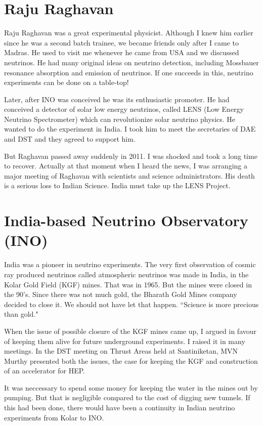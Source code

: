 \section*{Raju Raghavan}

Raju Raghavan was a great experimental physicist. Although I knew him 
earlier since he was a second batch trainee, we became friends only 
after I came to Madras. He used to visit me whenever he came from USA 
and we discussed neutrinos. He had many original ideas on neutrino 
detection, including Mossbauer resonance absorption and emission of 
neutrinos. If one succeeds in this, neutrino experiments can be done on 
a table-top!
 
Later, after INO was conceived he was its enthusiastic promoter. He had 
conceived a detector of solar low energy neutrinos, called LENS (Low 
Energy Neutrino Spectrometer) which can revolutionize solar neutrino 
physics. He wanted to do the experiment in India. I took him to meet the 
secretaries of DAE and DST and they agreed to support him.

But Raghavan passed away suddenly in 2011. I was shocked and took a long 
time to recover. Actually at that moment when I heard the news, I was 
arranging a major meeting of Raghavan with scientists and science 
administrators. His death is a serious loss to Indian Science. India 
must take up the LENS Project.

\section*{India-based Neutrino Observatory (INO)}

India was a pioneer in neutrino experiments. The very first observation 
of cosmic ray produced neutrinos called atmospheric neutrinos was made 
in India, in the Kolar Gold Field (KGF) mines. That was in 1965. But the 
mines were closed in the 90's. Since there was not much gold, the 
Bharath Gold Mines company decided to close it. We should not have let 
that happen. ``Science is more precious than gold."

When the issue of possible closure of the KGF mines came up, I argued in 
favour of keeping them alive for future underground experiments. I 
raised it in many meetings. In the DST meeting on Thrust Areas held at 
Santiniketan, MVN Murthy presented both the issues, the case for keeping 
the KGF and construction of an accelerator for HEP.

It was neccessary to spend some money for keeping the water in the mines 
out by pumping. But that is negligible compared to the cost of digging 
new tunnels. If this had been done, there would have been a continuity 
in Indian neutrino experiments from Kolar to INO.

